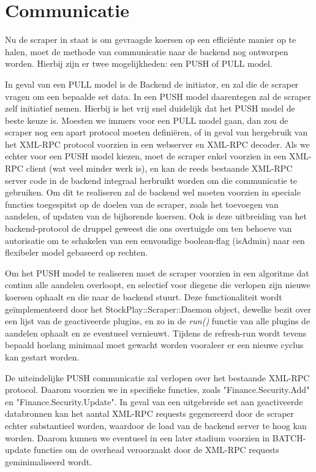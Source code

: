 \section{Communicatie}

Nu de scraper in staat is om gevraagde koersen op een effici\"ente manier op te halen, moet de methode van communicatie naar de backend nog ontworpen worden. Hierbij zijn er twee mogelijkheden: een PUSH of PULL model.

In geval van een PULL model is de Backend de initiator, en zal die de scraper vragen om een bepaalde set data. In een PUSH model daarentegen zal de scraper zelf initiatief nemen. Hierbij is het vrij snel duidelijk dat het PUSH model de beste keuze is. Moesten we immers voor een PULL model gaan, dan zou de scraper nog een apart protocol moeten defini\"eren, of in geval van hergebruik van het XML-RPC protocol voorzien in een webserver en XML-RPC decoder. Als we echter voor een PUSH model kiezen, moet de scraper enkel voorzien in een XML-RPC client (wat veel minder werk is), en kan de reeds bestaande XML-RPC server code in de backend integraal herbruikt worden om die communicatie te gebruiken.
Om dit te realiseren zal de backend wel moeten voorzien in speciale functies toegespitst op de doelen van de scraper, zoals het toevoegen van aandelen, of updaten van de bijhorende koersen. Ook is deze uitbreiding van het backend-protocol de druppel geweest die ons overtuigde om ten behoeve van autorisatie om te schakelen van een eenvoudige boolean-flag (isAdmin) naar een flexibeler model gebaseerd op rechten.

Om het PUSH model te realiseren moet de scraper voorzien in een algoritme dat continu alle aandelen overloopt, en selectief voor diegene die verlopen zijn nieuwe koersen ophaalt en die naar de backend stuurt. Deze functionaliteit wordt ge\"implementeerd door het StockPlay::Scraper::Daemon object, dewelke bezit over een lijst van de geactiveerde plugins, en zo in de \emph{run()} functie van alle plugins de aandelen ophaalt en ze eventueel vernieuwt. Tijdens de refresh-run wordt tevens bepaald hoelang minimaal moet gewacht worden vooraleer er een nieuwe cyclus kan gestart worden.

De uiteindelijke PUSH communicatie zal verlopen over het bestaande XML-RPC protocol. Daarom voorzien we in specifieke functies, zoals "Finance.Security.Add" en "Finance.Security.Update". In geval van een uitgebreide set aan geactiveerde databronnen kan het aantal XML-RPC requests gegenereerd door de scraper echter substantieel worden, waardoor de load van de backend server te hoog kan worden. Daarom kunnen we eventueel in een later stadium voorzien in BATCH-update functies om de overhead veroorzaakt door de XML-RPC requests geminimaliseerd wordt.



